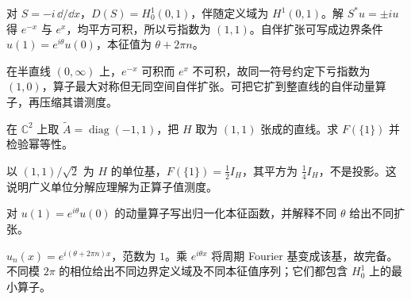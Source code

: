 \begin{example}[区间与半直线上的动量]
对 $S=-i\,\dd/\dd x$，$D(S)=H_0^1(0,1)$，伴随定义域为 $H^1(0,1)$。解 $S^*u=\pm iu$ 得 $e^{-x}$ 与 $e^x$，均平方可积，所以亏指数为 $(1,1)$。自伴扩张可写成边界条件 $u(1)=e^{i\theta}u(0)$，本征值为 $\theta+2\pi n$。

在半直线 $(0,\infty)$ 上，$e^{-x}$ 可积而 $e^x$ 不可积，故同一符号约定下亏指数为 $(1,0)$，算子最大对称但无同空间自伴扩张。可把它扩到整直线的自伴动量算子，再压缩其谱测度。
\end{example}

\begin{exercise}[压缩未必为投影]\label{ex:y11-compressed-pvm}
在 $\mathbb C^2$ 上取 $\widetilde A=\operatorname{diag}(-1,1)$，把 $H$ 取为 $(1,1)$ 张成的直线。求 $F(\{1\})$ 并检验幂等性。
\end{exercise}
\begin{solution}
以 $(1,1)/\sqrt2$ 为 $H$ 的单位基，$F(\{1\})=\tfrac12I_H$，其平方为 $\tfrac14I_H$，不是投影。这说明广义单位分解应理解为正算子值测度。
\end{solution}

\begin{exercise}[区间边界相位]\label{ex:y11-boundary-phase}
对 $u(1)=e^{i\theta}u(0)$ 的动量算子写出归一化本征函数，并解释不同 $\theta$ 给出不同扩张。
\end{exercise}
\begin{solution}
$u_n(x)=e^{i(\theta+2\pi n)x}$，范数为 $1$。乘 $e^{i\theta x}$ 将周期 Fourier 基变成该基，故完备。不同模 $2\pi$ 的相位给出不同边界定义域及不同本征值序列；它们都包含 $H_0^1$ 上的最小算子。
\end{solution}
